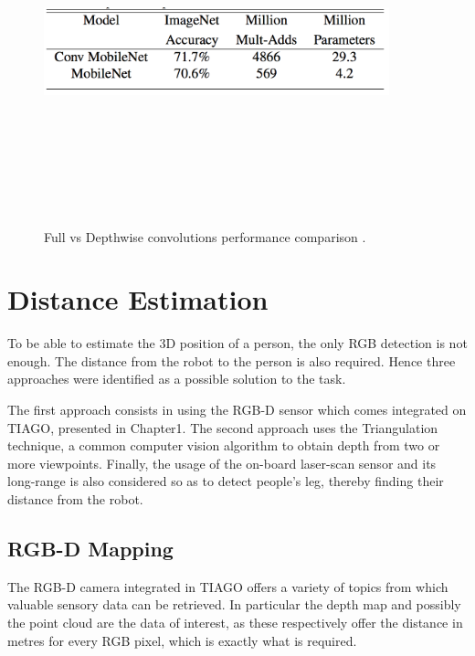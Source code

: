 \begin{figure}[!htbp]
\begin{center}
\includegraphics[width=10cm,height=10cm,keepaspectratio]{images/mobileNet_table.png}
\end{center}
\caption{Full vs Depthwise convolutions performance comparison \cite{paper:MobileNets}.}
\end{figure}

\section{Distance Estimation}

To be able to estimate the 3D position of a person, the only RGB detection is not enough. The distance from the robot to the person is also required. Hence three approaches were identified as a possible solution to the task.

The first approach consists in using the RGB-D sensor which comes integrated on TIAGO, presented in Chapter1. The second approach uses the Triangulation technique, a common computer vision algorithm to obtain depth from two or more viewpoints. Finally, the usage of the on-board laser-scan sensor and its long-range is also considered so as to detect people's leg, thereby finding their distance from the robot.

\subsection{RGB-D Mapping}

The RGB-D camera integrated in TIAGO offers a variety of topics from which valuable sensory data can be retrieved. In particular the depth map and possibly the point cloud are the data of interest, as these respectively offer the distance in metres for every RGB pixel, which is exactly what is required.

